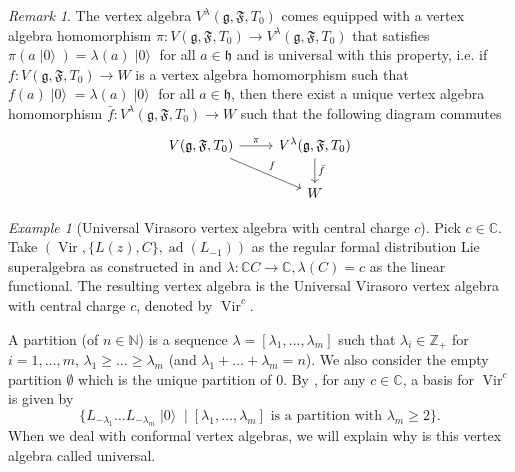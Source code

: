 \documentclass[a4paper, 12pt, reqno]{amsart}
\theoremstyle{remark}
\newtheorem{remark}[theorem]{Remark}
\newtheorem{example}[theorem]{Example}
\numberwithin{equation}{subsection}
\DeclareMathOperator{\Vir}{Vir}
\DeclareMathOperator{\vac}{|0\rangle}
\DeclareMathOperator{\ad}{ad}
\begin{document}
\begin{remark}
  \label{rmk:14}
  The vertex algebra $V^{\lambda}(\mathfrak{g}, \mathfrak{F}, T_0)$ comes equipped with a vertex algebra homomorphism $\pi: V(\mathfrak{g}, \mathfrak{F}, T_0) \to V^{\lambda}(\mathfrak{g}, \mathfrak{F}, T_0)$ that satisfies $\pi(a\vac) = \lambda(a)\vac$ for all $a \in \mathfrak{h}$ and is universal with this property, i.e. if $f: V(\mathfrak{g}, \mathfrak{F}, T_0)\to W$ is a vertex algebra homomorphism such that $f(a)\vac = \lambda(a)\vac$ for all $a \in \mathfrak{h}$, then there exist a unique vertex algebra homomorphism $\bar{f}: V^{\lambda}(\mathfrak{g}, \mathfrak{F}, T_0)\to W$ such that the following diagram commutes
  \begin{equation*}
    \begin{tikzcd}
      {V(\mathfrak{g}, \mathfrak{F}, T_0)} \arrow[rd, "f"] \arrow[r, "\pi"] & {V^\lambda(\mathfrak{g}, \mathfrak{F}, T_0)} \arrow[d, "\bar{f}"] \\
      & W                                                    
    \end{tikzcd}
  \end{equation*}
\end{remark}

\begin{example}[Universal Virasoro vertex algebra with central charge $c$]
  \label{exa:5}
  Pick $c \in \mathbb{C}$.
  Take $(\Vir, \{L(z), C\}, \ad(L_{-1}))$ as the regular formal distribution Lie superalgebra as constructed in  and $\lambda: \mathbb{C}C \to \mathbb{C}, \lambda(C) = c$ as the linear functional.
  The resulting vertex algebra is the Universal Virasoro vertex algebra with central charge $c$, denoted by $\Vir^c$.

  A partition (of $n \in \mathbb{N}$) is a sequence $\lambda = [\lambda_1, \dots, \lambda_m]$ such that $\lambda_i \in \mathbb{Z}_+$ for $i = 1, \dots, m$, $\lambda_1 \ge \dots \ge \lambda_m$ (and $\lambda_1 + \dots + \lambda_m = n$).
  We also consider the empty partition $\emptyset$ which is the unique partition of $0$.
  By , for any $c \in \mathbb{C}$, a basis for $\Vir^c$ is given by
  \begin{equation*}
    \{L_{-\lambda_1}\dots L_{-\lambda_m}\vac \mid [\lambda_1, \dots, \lambda_m]\text{ is a partition with } \lambda_m \ge 2\}.
  \end{equation*}
  When we deal with conformal vertex algebras, we will explain why is this vertex algebra called universal.
\end{example}
\end{document}
